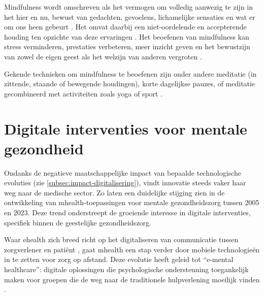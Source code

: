 \vspace{1em}

Mindfulness wordt omschreven als het vermogen om volledig aanwezig te zijn in het hier en nu, bewust van gedachten, gevoelens, lichamelijke sensaties en wat er om ons heen gebeurt \autocite{mindful2020}. Het omvat daarbij een niet-oordelende en accepterende houding ten opzichte van deze ervaringen \autocite{Keng2011}. Het beoefenen van mindfulness kan stress verminderen, prestaties verbeteren, meer inzicht geven en het bewustzijn van zowel de eigen geest als het welzijn van anderen vergroten \autocite{mindful2020}. 

\vspace{1em}

Gekende technieken om mindfulness te beoefenen zijn onder andere meditatie (in zittende, staande of bewegende houdingen), korte dagelijkse pauzes, of meditatie gecombineerd met activiteiten zoals yoga of sport \autocite{mindful2020}.

\newpage




\section{Digitale interventies voor mentale gezondheid}
\label{sec:digitale-interventies}

\vspace{1em}

Ondanks de negatieve maatschappelijke impact van bepaalde technologische evoluties (zie \ref{subsec:impact-digitalisering}), vindt innovatie steeds vaker haar weg naar de medische sector. Zo laten \textcite{Zhang2025} een duidelijke stijging zien in de ontwikkeling van \acrshort{mhealth}-toepassingen voor mentale gezondheidszorg tussen 2005 en 2023. Deze trend onderstreept de groeiende interesse in digitale interventies, specifiek binnen de geestelijke gezondheidszorg.

\vspace{1em}

Waar \acrshort{ehealth} zich breed richt op het digitaliseren van communicatie tussen zorgverlener en patiënt \autocite{Hallberg2020}, gaat \acrshort{mhealth} een stap verder door mobiele technologieën in te zetten voor zorg op afstand. Deze evolutie heeft geleid tot “e-mental healthcare”: digitale oplossingen die psychologische ondersteuning toegankelijk maken voor groepen die de weg naar de traditionele hulpverlening moeilijk vinden \autocite{Timakum2022}.


